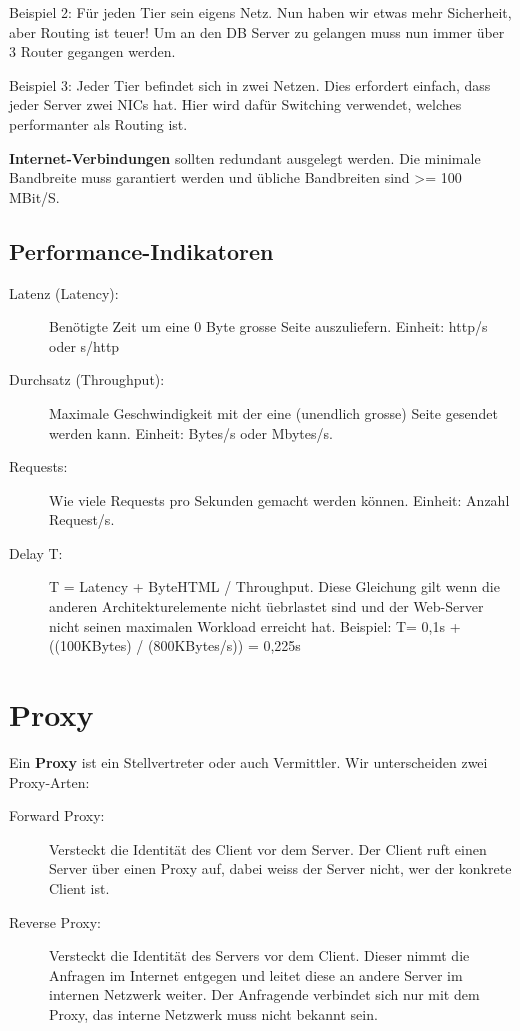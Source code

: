 Beispiel 2: Für jeden Tier sein eigens Netz. Nun haben wir etwas mehr Sicherheit, aber Routing ist teuer! Um an den DB Server zu gelangen muss nun immer über 3 Router gegangen werden.

Beispiel 3: Jeder Tier befindet sich in zwei Netzen. Dies erfordert einfach, dass jeder Server zwei NICs hat. Hier wird dafür Switching verwendet, welches performanter als Routing ist.

\textbf{Internet-Verbindungen} sollten redundant ausgelegt werden. Die minimale Bandbreite muss garantiert werden und übliche Bandbreiten sind >= 100 MBit/S.

\subsection{Performance-Indikatoren}
\begin{description}
	\item[Latenz (Latency):] Benötigte Zeit um eine 0 Byte grosse Seite auszuliefern. Einheit: http/s oder s/http
	\item[Durchsatz (Throughput):] Maximale Geschwindigkeit mit der eine (unendlich grosse) Seite gesendet werden kann. Einheit: Bytes/s oder Mbytes/s.
	\item[Requests:] Wie viele Requests pro Sekunden gemacht werden können. Einheit: Anzahl Request/s.
	\item[Delay T:] T = Latency + ByteHTML / Throughput. Diese Gleichung gilt wenn die anderen Architekturelemente nicht üebrlastet sind und der Web-Server nicht seinen maximalen Workload erreicht hat. Beispiel: T= 0,1s + ((100KBytes) / (800KBytes/s)) = 0,225s
\end{description}

\section{Proxy}
Ein \textbf{Proxy} ist ein Stellvertreter oder auch Vermittler. Wir unterscheiden zwei Proxy-Arten:

\begin{description}
	\item[Forward Proxy:] Versteckt die Identität des Client vor dem Server. Der Client ruft einen Server über einen Proxy auf, dabei weiss der Server nicht, wer der konkrete Client ist.
	\item[Reverse Proxy:] Versteckt die Identität des Servers vor dem Client.  Dieser nimmt die Anfragen im Internet entgegen und leitet diese an andere Server im internen Netzwerk weiter. Der Anfragende verbindet sich nur mit dem Proxy, das interne Netzwerk muss nicht bekannt sein.
\end{description}

